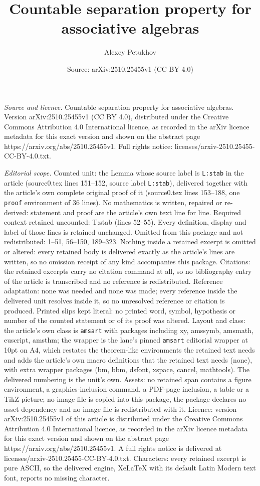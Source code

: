 \documentclass[10pt,a4paper]{amsart}
\title[Countable separation property for associative algebras]{Countable separation property for associative algebras}
\author{Alexey Petukhov}
\date{Source: arXiv:2510.25455v1 (CC BY 4.0)}
\begin{document}
\maketitle

\noindent\emph{Source and licence.} Countable separation property for associative algebras. Version arXiv:2510.25455v1 (CC BY 4.0), distributed under the Creative Commons Attribution 4.0 International licence, as recorded in the arXiv licence metadata for this exact version and shown on the abstract page https://arxiv.org/abs/2510.25455v1. Full rights notice: licenses/arxiv-2510.25455-CC-BY-4.0.txt.\par\smallskip

\noindent\textit{Editorial scope.} Counted unit: the Lemma whose source label is \texttt{L:stab} in the article (source0.tex lines 151--152, source label \texttt{L:stab}), delivered together with the article's own complete original proof of it (source0.tex lines 153--188, one \texttt{proof} environment of 36 lines). No mathematics is written, repaired or re-derived: statement and proof are the article's own text line for line. Required context retained uncounted: T:stab (lines 52--55). Every definition, display and label of those lines is retained unchanged. Omitted from this package and not redistributed: 1--51, 56--150, 189--323. Nothing inside a retained excerpt is omitted or altered: every retained body is delivered exactly as the article's lines are written, so no omission receipt of any kind accompanies this package. Citations: the retained excerpts carry no citation command at all, so no bibliography entry of the article is transcribed and no reference is redistributed. Reference adaptation: none was needed and none was made; every reference inside the delivered unit resolves inside it, so no unresolved reference or citation is produced. Printed slips kept literal: no printed word, symbol, hypothesis or number of the counted statement or of its proof was altered. Layout and class: the article's own class is \texttt{amsart} with packages including xy, amssymb, amsmath, euscript, amsthm; the wrapper is the lane's pinned \texttt{amsart} editorial wrapper at 10pt on A4, which restates the theorem-like environments the retained text needs and adds the article's own macro definitions that the retained text needs (none), with extra wrapper packages (bm, bbm, dsfont, xspace, cancel, mathtools). The delivered numbering is the unit's own. Assets: no retained span contains a figure environment, a graphics-inclusion command, a PDF-page inclusion, a table or a TikZ picture; no image file is copied into this package, the package declares no asset dependency and no image file is redistributed with it. Licence: version arXiv:2510.25455v1 of this article is distributed under the Creative Commons Attribution 4.0 International licence, as recorded in the arXiv licence metadata for this exact version and shown on the abstract page https://arxiv.org/abs/2510.25455v1. A full rights notice is delivered at licenses/arxiv-2510.25455-CC-BY-4.0.txt. Characters: every retained excerpt is pure ASCII, so the delivered engine, XeLaTeX with its default Latin Modern text font, reports no missing character.
\end{document}
